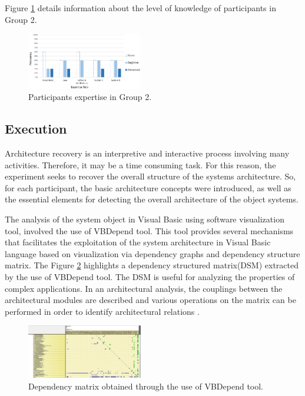 \documentclass{sig-alternate-05-2015}
\begin{document}
Figure \ref{conhecimentoGrupo2} details information about the level of knowledge of participants in Group 2.

\begin{figure}[!h]
	\centering
	\includegraphics[width=0.45\textwidth]{6_expertise_participantes_grupo_2_en}
	\caption{Participants expertise in Group 2.}
	\label{conhecimentoGrupo2}
\end{figure}


\subsection{Execution}%
Architecture recovery is an interpretive and interactive process involving many activities. Therefore, it may be a time consuming task. For this reason, the experiment seeks to recover the overall structure of the systems architecture. So, for each participant, the basic architecture concepts were introduced, as well as the essential elements for detecting the overall architecture of the object systems. 

The analysis of the system object in Visual Basic using software visualization tool, involved the use of VBDepend tool. This tool provides several mechanisms that facilitates the exploitation of the system architecture in Visual Basic language based on visualization via dependency graphs and dependency structure matrix. The Figure  \ref{matrizDependenciaVBDependend} highlights a dependency structured  matrix(DSM) extracted by the use of VBDepend tool. The DSM is useful for analyzing the properties of complex applications. In an architectural analysis, the couplings between the architectural modules are described and various operations on the matrix can be performed in order to identify architectural relations \cite{Tekinerdogan_2009}.

\begin{figure}[!h]
	\centering
	\includegraphics[width=0.45\textwidth]{6_matrizDependenciaVBDependend}
	\caption{Dependency matrix obtained through the use of VBDepend tool.}
	\label{matrizDependenciaVBDependend}
\end{figure}
\end{document}

